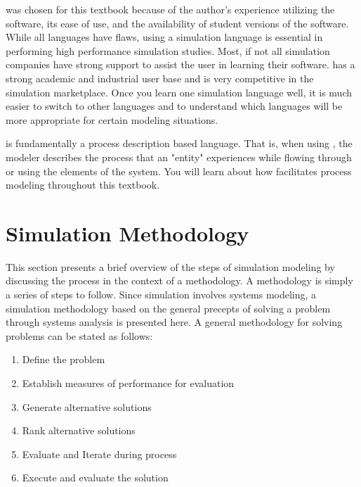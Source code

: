 \documentclass[
]{book}
\theoremstyle{definition}
\theoremstyle{definition}
\theoremstyle{definition}
\theoremstyle{definition}
\theoremstyle{remark}
\begin{document}
was chosen for this textbook because of the author's experience
utilizing the software, its ease of use, and the availability of student
versions of the software. While all languages have flaws, using a
simulation language is essential in performing high performance
simulation studies. Most, if not all simulation companies have strong
support to assist the user in learning their software. has a strong
academic and industrial user base and is very competitive in the
simulation marketplace. Once you learn one simulation language well, it
is much easier to switch to other languages and to understand which
languages will be more appropriate for certain modeling situations.

is fundamentally a process description based language. That is, when
using , the modeler describes the process that an "entity" experiences
while flowing through or using the elements of the system. You will
learn about how facilitates process modeling throughout this textbook.

\hypertarget{ch1:sec:simMeth}{%
\section{Simulation Methodology}\label{ch1:sec:simMeth}}

This section presents a brief overview of the steps of simulation
modeling by discussing the process in the context of a methodology. A
methodology is simply a series of steps to follow. Since simulation
involves systems modeling, a simulation methodology based on the general
precepts of solving a problem through systems analysis is presented
here. A general methodology for solving problems can be stated as
follows:

\begin{enumerate}
\def\labelenumi{\arabic{enumi}.}
\item
  Define the problem
\item
  Establish measures of performance for evaluation
\item
  Generate alternative solutions
\item
  Rank alternative solutions
\item
  Evaluate and Iterate during process
\item
  Execute and evaluate the solution
\end{enumerate}
\end{document}
